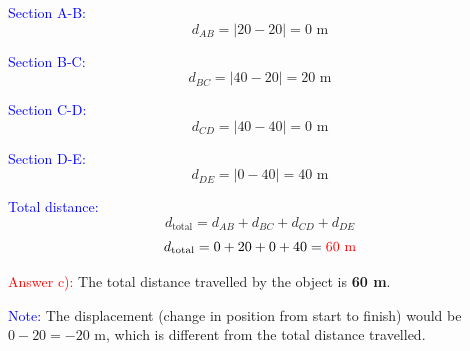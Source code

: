 \begin{exercise}
\begin{solu}
        \textcolor{blue}{Section A-B:}
        \[
            d_{AB} = |20 - 20| = 0 \text{ m}
        \]

        \textcolor{blue}{Section B-C:}
        \[
            d_{BC} = |40 - 20| = 20 \text{ m}
        \]

        \textcolor{blue}{Section C-D:}
        \[
            d_{CD} = |40 - 40| = 0 \text{ m}
        \]

        \textcolor{blue}{Section D-E:}
        \[
            d_{DE} = |0 - 40| = 40 \text{ m}
        \]

        \textcolor{blue}{Total distance:}
        \[
            d_{\text{total}} = d_{AB} + d_{BC} + d_{CD} + d_{DE}
        \]
        \[
            d_{\text{total}} = 0 + 20 + 0 + 40 = \textcolor{red}{60 \text{ m}}
        \]

        \textcolor{red}{Answer c):} The total distance travelled by the object is \textbf{60 m}.

        \textcolor{blue}{Note:} The displacement (change in position from start to finish) would be $0 - 20 = -20$ m, which is different from the total distance travelled.
    \end{solu}
\end{exercise}

